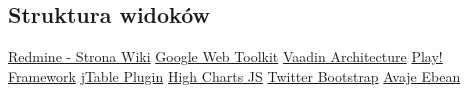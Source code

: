 \documentclass[a4paper,12pt,notitlepage]{mwrep}
\begin{document}
\subsection{Struktura widoków}



\addtocounter{page}{-1}

\begin{thebibliography}{9}
	\href{http://www.redmine.org/projects/redmine/wiki/}{Redmine - Strona Wiki}
	\href{https://developers.google.com/web-toolkit/}{Google Web Toolkit}
	\href{https://vaadin.com/book/vaadin7/-/page/architecture.html}{Vaadin Architecture}
	\href{http://www.playframework.com/}{Play! Framework}
	\href{http://jtable.org/}{jTable Plugin}
	\href{http://www.highcharts.com/}{High Charts JS}
	\href{http://twitter.github.io/bootstrap/}{Twitter Bootstrap}
	\href{http://www.avaje.org/}{Avaje Ebean}

\end{thebibliography}


\label{LastPage}
\end{document}
